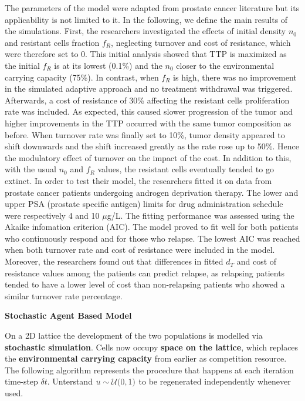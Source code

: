 \documentclass[11pt,a4paper]{article}
\begin{document}
The parameters of the model were adapted from prostate cancer literature but its applicability is not limited to it. In the following, we define the main results of the simulations.
First, the researchers investigated the effects of initial density $n_0$ and resistant cells fraction $f_R$, neglecting turnover and cost of resistance, which were therefore set to 0.
This initial analysis showed that TTP is maximized as the initial $f_R$ is at its lowest (0.1\%) and the $n_0$ closer to the environmental carrying capacity (75\%).
In contrast, when $f_R$ is high, there was no improvement in the simulated adaptive approach and no treatment withdrawal was triggered.
Afterwards, a cost of resistance of 30\% affecting the resistant cells proliferation rate was included. As expected, this caused slower progression of the tumor and higher improvements in the TTP occurred with the same tumor composition as before.
When turnover rate was finally set to 10\%, tumor density appeared to shift downwards and the shift increased greatly as the rate rose up to 50\%. Hence the modulatory effect of turnover on the impact of the cost.
In addition to this, with the usual $n_0$ and $f_R$ values, the resistant cells eventually tended to go extinct. In order to test their model, the researchers fitted it on data from prostate cancer patients undergoing androgen deprivation therapy.
The lower and upper PSA (prostate specific antigen)  limits for drug administration schedule were respectively 4 and 10 $\mu$g/L. 
The fitting performance was assessed using the Akaike infomation criterion (AIC). The model proved to fit well for both patients who continuously respond and for those who relapse. 
The lowest AIC was reached when both turnover rate and cost of resistance were included in the model.
Moreover, the researchers found out that differences in fitted $d_T$ and cost of resistance values among the patients can predict relapse, as relapsing patients tended to have a lower level of cost than non-relapsing patients who showed a similar turnover rate percentage. \\


 \vspace{2mm}

\textbf{Stochastic Agent Based Model}

 \vspace{1mm}
 
On a 2D lattice the development of the two populations is modelled via \textbf{stochastic simulation}.
Cells now occupy \textbf{space on the lattice}, which replaces the \textbf{environmental carrying capacity} from earlier as competition resource.
The following algorithm represents the procedure that happens at each iteration time-step $\delta t$.
Unterstand $\textcolor{darkgray}{u \sim \mathcal{U}(0,1)}$ to be regenerated independently whenever used.
\end{document}
